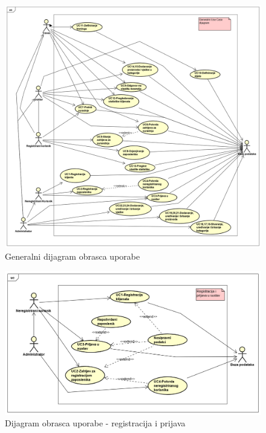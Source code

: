 					\begin{figure}[H]
						\includegraphics[scale=0.40]{dijagrami/UseCase/UseCase Diagram0.PNG}
						\centering
						\caption{Generalni dijagram obrasca uporabe}
						\label{fig:promjene}
					\end{figure}
				
					\begin{figure}[H]
						\includegraphics[scale=0.50]{dijagrami/UseCase/UseCase Diagram1.PNG}
						\centering
						\caption{Dijagram obrasca uporabe - registracija i prijava}
						\label{fig:promjene}
					\end{figure}
				
